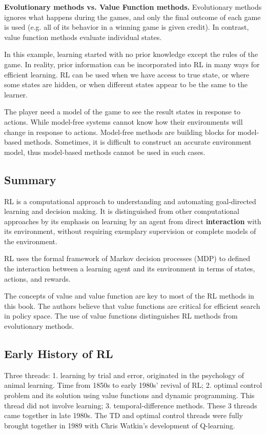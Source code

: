 \documentclass[sutton_barto_notes.tex]{subfiles}
\begin{document}
\textbf{Evolutionary methods vs. Value Function methods.} Evolutionary methods ignores what happens during the games, and only the final outcome of each game is used (e.g. all of its behavior in a winning game is given credit). In contrast, value function methods evaluate individual states.

In this example, learning started with no prior knowledge except the rules of the game. In reality, prior information can be incorporated into RL in many ways for efficient learning.
RL can be used when we have access to true state, or where some states are hidden, or when different states appear to be the same to the learner.

The player need a model of the game to see the result states in response to actions. While model-free systems cannot know how their environments will change in response to actions.
Model-free methods are building blocks for model-based methods.
Sometimes, it is difficult to construct an accurate environment model, thus model-based methods cannot be used in such cases.

\subsection{Summary}

RL is a computational approach to understanding and automating goal-directed learning and decision making.
It is distinguished from other computational approaches by its emphasis on learning by an agent from direct \textbf{interaction} with its environment, without requiring exemplary supervision or complete models of the environment.

RL uses the formal framework of Markov decision processes (MDP) to defined the interaction between a learning agent and its environment in terms of states, actions, and rewards.

The concepts of value and value function are key to most of the RL methods in this book.
The authors believe that value functions are critical for efficient search in policy space.
The use of value functions distinguishes RL methods from evolutionary methods.

\subsection{Early History of RL}

Three threads: 
1. learning by trial and error, originated in the psychology of animal learning. Time from 1850s to early 1980s' revival of RL;
2. optimal control problem and its solution using value functions and dynamic programming. This thread did not involve learning;
3. temporal-difference methods.
These 3 threads came together in late 1980s.
The TD and optimal control threads were fully brought together in 1989 with Chris Watkin's development of Q-learning.
\end{document}
